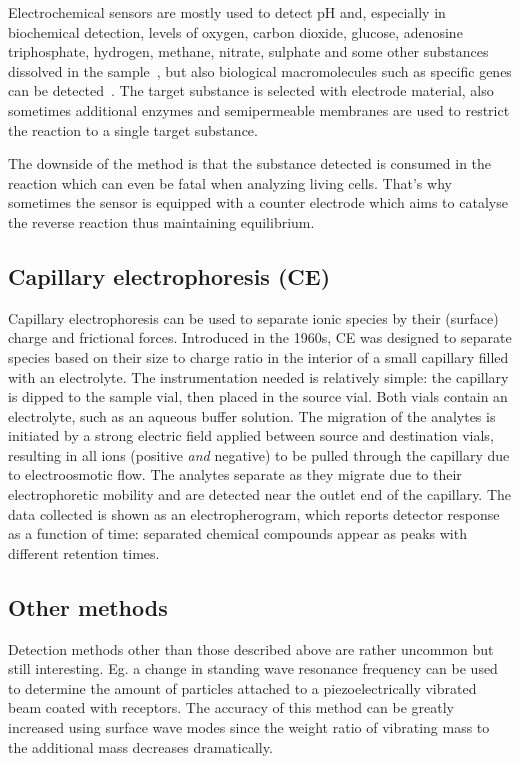 \documentclass[12pt]{article}
\begin{document}
Electrochemical sensors are mostly used to detect pH and, especially in biochemical detection, levels of oxygen, carbon dioxide, glucose,
adenosine triphosphate, hydrogen, methane, nitrate, sulphate and some other substances
dissolved in the sample~\cite{yotter_2004}, but also biological macromolecules such as specific
genes can be detected~\cite{wu_2008}. The target substance is selected with electrode material, also 
sometimes additional enzymes and semipermeable membranes are used to restrict the reaction
to a single target substance.

The downside of the method is that the substance detected is consumed in the reaction 
which can even be fatal when analyzing living cells. That's why sometimes the sensor is
equipped with a counter electrode which aims to catalyse the reverse reaction thus 
maintaining equilibrium.

\subsection{Capillary electrophoresis (CE)}
Capillary electrophoresis can be used to separate ionic species by their (surface) charge 
and frictional forces. Introduced in the 1960s, CE was designed to separate species based 
on their size to charge ratio in the interior of a small capillary filled with an electrolyte.
The instrumentation needed is relatively simple:
the capillary is dipped to the sample vial, then placed in the source vial. Both vials
contain an electrolyte, such as an aqueous buffer solution. The migration of the analytes is
initiated by a strong electric field applied between source and destination vials, resulting 
in all ions (positive \textit{and} negative) to be pulled through the capillary due to
electroosmotic flow. The analytes separate as they migrate due to their electrophoretic mobility
and are detected near the outlet end of the capillary. The data collected is shown as an 
electropherogram, which reports detector response as a function of time: separated chemical 
compounds appear as peaks with different retention times.~\cite{SKOOG_2006}

\subsection{Other methods}
Detection methods other than those described above are rather uncommon but still interesting.
Eg. a change in standing wave resonance frequency can be used to determine the amount of 
particles attached to a piezoelectrically vibrated beam coated with receptors. The accuracy 
of this method can be greatly increased using surface wave modes since the weight ratio of 
vibrating mass to the additional mass decreases dramatically.~\cite{GRATE_2000}
\end{document}
